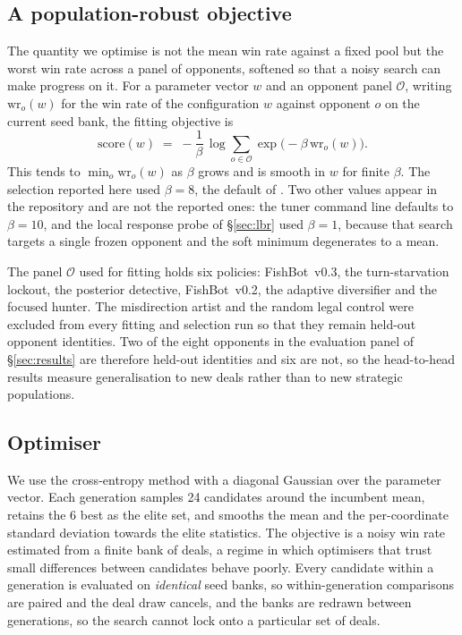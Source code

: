 \documentclass[11pt]{article}
\theoremstyle{definition}
\DeclareRobustCommand{\vthree}{\texorpdfstring{\mbox{FishBot v0.3}}{FishBot v0.3}}
\DeclareRobustCommand{\vtwo}{\texorpdfstring{\mbox{FishBot v0.2}}{FishBot v0.2}}
\newcommand{\numCEMPop}{24}
\newcommand{\numCEMElite}{6}
\begin{document}
\subsection{A population-robust objective}

The quantity we optimise is not the mean win rate against a fixed pool but the
worst win rate across a panel of opponents, softened so that a noisy search can
make progress on it. For a parameter vector $w$ and an opponent panel
$\mathcal{O}$, writing $\mathrm{wr}_o(w)$ for the win rate of the configuration
$w$ against opponent $o$ on the current seed bank, the fitting objective is
\begin{equation}
  \mathrm{score}(w) \;=\; -\frac{1}{\beta}\,
     \log \sum_{o \in \mathcal{O}} \exp\bigl(-\beta\, \mathrm{wr}_o(w)\bigr).
  \label{eq:softmin}
\end{equation}
This tends to $\min_o \mathrm{wr}_o(w)$ as $\beta$ grows and is smooth in $w$ for
finite $\beta$. The selection reported here used $\beta = 8$, the default of
. Two other values appear in the repository and
are not the reported ones: the tuner command line defaults to $\beta = 10$, and
the local response probe of \S\ref{sec:lbr} used $\beta = 1$, because that search
targets a single frozen opponent and the soft minimum degenerates to a mean.

The panel $\mathcal{O}$ used for fitting holds six policies: \vthree{}, the
turn-starvation lockout, the posterior detective, \vtwo{}, the adaptive
diversifier and the focused hunter. The misdirection artist and the random legal
control were excluded from every fitting and selection run so that they remain
held-out opponent identities. Two of the eight opponents in the evaluation panel
of \S\ref{sec:results} are therefore held-out identities and six are not, so the
head-to-head results measure generalisation to new deals rather than to new
strategic populations.

\subsection{Optimiser}

We use the cross-entropy method with a diagonal Gaussian over the parameter
vector. Each generation samples \numCEMPop{} candidates around the incumbent
mean, retains the \numCEMElite{} best as the elite set, and smooths the mean and
the per-coordinate standard deviation towards the elite statistics. The objective
is a noisy win rate estimated from a finite bank of deals, a regime in which
optimisers that trust small differences between candidates behave poorly. Every
candidate within a generation is evaluated on \emph{identical} seed banks, so
within-generation comparisons are paired and the deal draw cancels, and the banks
are redrawn between generations, so the search cannot lock onto a particular set
of deals.
\end{document}
